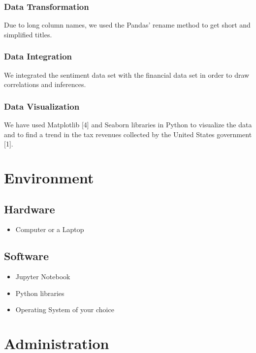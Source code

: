 \documentclass[12pt,a4paper]{article}
\begin{document}
\subsubsection{Data Transformation}

Due to long column names, we used the Pandas’ rename method to get short and simplified titles.


\subsubsection{Data Integration}

We integrated the sentiment data set with the financial data set in order to draw correlations and inferences.

\subsubsection{Data Visualization}

We have used Matplotlib [4] and Seaborn libraries in Python to visualize the data and to find a trend in the tax revenues collected by the United States government [1].

\section{Environment}

\subsection{Hardware}

\begin{itemize}
\item Computer or a Laptop 
\end{itemize}

\subsection{Software}

\begin{itemize}
\item Jupyter Notebook
\item Python libraries 
\item Operating System of your choice
\end{itemize}

\section{Administration}
\end{document}
